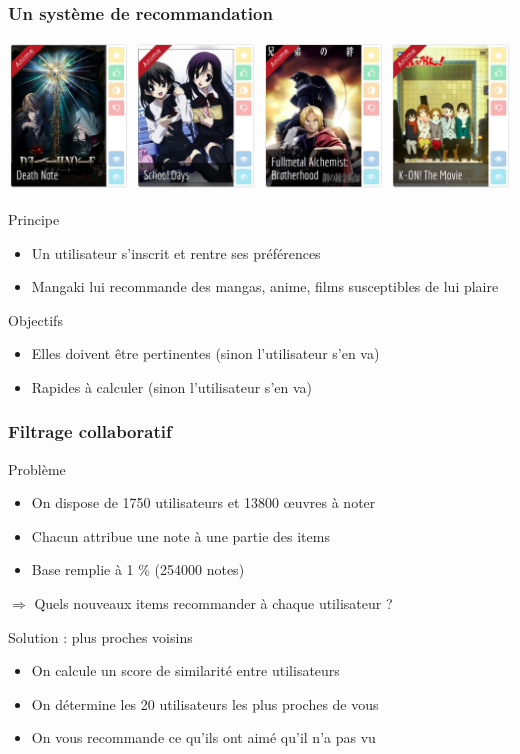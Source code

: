 \documentclass[handout]{beamer}
\begin{document}
\begin{frame}
	\frametitle{Un système de recommandation}
	\includegraphics[width=\linewidth]{figures/decks.jpg}
	\begin{block}{Principe}
	\begin{itemize}
	\item Un utilisateur s'inscrit et rentre ses préférences
	\item Mangaki lui recommande des mangas, anime, films susceptibles de lui plaire
	\end{itemize}
	\end{block}
	\pause
	\begin{block}{Objectifs}
	\begin{itemize}
	\item Elles doivent être \alert{pertinentes} (sinon l'utilisateur s'en va)
	\item \alert{Rapides} à calculer (sinon l'utilisateur s'en va)
	\end{itemize}
	\end{block}
\end{frame}

\begin{frame}
	\frametitle{Filtrage collaboratif}
	\begin{block}{Problème}
		\begin{itemize}
		\item On dispose de 1750 utilisateurs et 13800 œuvres à noter
		\item Chacun attribue une note à une \alert{partie} des items
		\item Base remplie à 1 \% (254000 notes)
		\end{itemize}
		$\Rightarrow$ Quels nouveaux items recommander à chaque utilisateur ?
	\end{block}
	\pause
	\begin{exampleblock}{Solution : plus proches voisins}
		\begin{itemize}[<+->]
		\item On calcule un score de similarité entre utilisateurs
		\item On détermine les 20 utilisateurs les plus proches de vous
		\item On vous recommande ce qu'ils ont aimé qu'il n'a pas vu
		\end{itemize}
	\end{exampleblock}
\end{frame}
\end{document}
